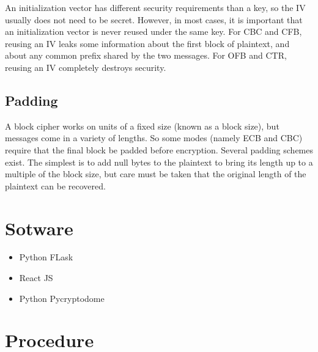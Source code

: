 \documentclass[fleqn, journal, onecolumn]{IEEEtran}             %
\theoremstyle{break}                                            %
\begin{document}
      An initialization vector has different security requirements than a key, so the IV usually does not
      need to be secret. However, in most cases, it is important that an initialization vector is never
      reused under the same key. For CBC and CFB, reusing an IV leaks some information about the first
      block of plaintext, and about any common prefix shared by the two messages. For OFB and CTR, reusing
      an IV completely destroys security.

      \cite{Wiki}


    \subsection{Padding}

      A block cipher works on units of a fixed size (known as a block size), but messages come in a variety of lengths.
      So some modes (namely ECB and CBC) require that the final block be padded before encryption. Several padding schemes exist.
      The simplest is to add null bytes to the plaintext to bring its length up to a multiple of the block size,
      but care must be taken that the original length of the plaintext can be recovered.

      \cite{Wiki}

  

  \section{Sotware}

    \begin{itemize}
      \item Python FLask  \cite{Flask}
      \item React JS  \cite{React}
      \item Python Pycryptodome \cite{Pycryptodome}
    \end{itemize}

  \section{Procedure}
\end{document}
